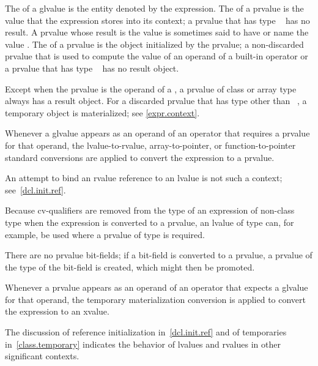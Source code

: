 \pnum
The  of a glvalue is the entity denoted by the expression.
The  of a prvalue
is the value that the expression stores into its context;
a prvalue that has type \cv{}~ has no result.
A prvalue whose result is the value 
is sometimes said to have or name the value .
The  of a prvalue is the object initialized by the prvalue;
a non-discarded prvalue
that is used to compute the value of an operand of a built-in operator
or a prvalue that has type \cv{}~
has no result object.
\begin{note}
Except when the prvalue is the operand of a ,
a prvalue of class or array type always has a result object.
For a discarded prvalue that has type other than \cv{}~,
a temporary object is materialized; see \ref{expr.context}.
\end{note}

\pnum
Whenever a glvalue appears as an operand of an operator that
requires a prvalue for that operand, the
lvalue-to-rvalue, array-to-pointer,
or function-to-pointer standard conversions are
applied to convert the expression to a prvalue.
\begin{note}
An attempt to bind an rvalue reference to an lvalue is not such a context; see~\ref{dcl.init.ref}.
\end{note}
\begin{note}
Because cv-qualifiers are removed from the type of an expression of
non-class type when the expression is converted to a prvalue, an lvalue
of type  can, for example, be used where
a prvalue of type  is required.
\end{note}
\begin{note}
There are no prvalue bit-fields; if a bit-field is converted to a
prvalue, a prvalue of the type of the bit-field is
created, which might then be promoted.
\end{note}

\pnum
Whenever a prvalue appears as an operand of an operator that
expects a glvalue for that operand, the
temporary materialization conversion is
applied to convert the expression to an xvalue.

\pnum
\begin{note}
The discussion of reference initialization in~\ref{dcl.init.ref} and of
temporaries in~\ref{class.temporary} indicates the behavior of lvalues
and rvalues in other significant contexts.
\end{note}

